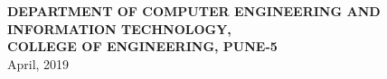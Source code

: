 \begin{titlepage}
\begin{center}
\Large{\bf{DEPARTMENT OF COMPUTER ENGINEERING AND \\INFORMATION TECHNOLOGY,\\ 
COLLEGE OF ENGINEERING, PUNE-5}}
 \\

\large{April, 2019}
\end{center}
\end{titlepage}
